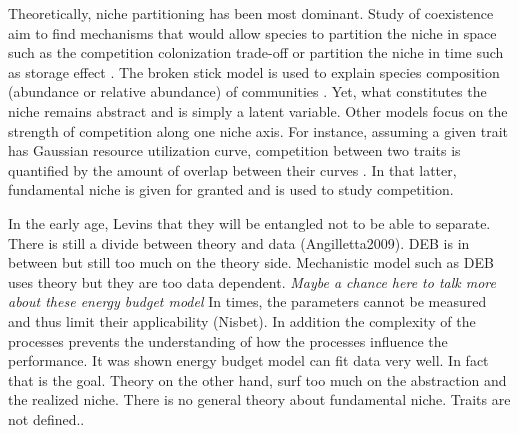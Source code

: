 Theoretically, niche partitioning has been most dominant.
Study of coexistence aim to find mechanisms that would allow species to partition the niche in space such as the competition colonization trade-off \citep[e.g.,][]{Levins1971,Tilman1994} or partition the niche in time such as storage effect \citep{Skellam1951, Chesson2000}. %
The broken stick model is used to explain species composition (abundance or relative abundance) of communities \citep{MacArthur1957}.
Yet, what constitutes the niche remains abstract and is simply a latent variable.
Other models focus on the strength of competition along one niche axis.
For instance, assuming a given trait has Gaussian resource utilization curve, competition  between two traits is quantified by the amount of overlap between their curves \citep{MacArthur1967, Roughgarden1979}.%
In that latter, fundamental niche is given for granted and is used to study competition.

In the early age, Levins that they will be entangled not to be able to separate.
There is still a divide between theory and data (Angilletta2009).
DEB is in between but still too much on the theory side.
Mechanistic model such as DEB uses theory but they are too data dependent.
\textit{Maybe a chance here to talk more about these energy budget model}
In times, the parameters cannot be measured and thus limit their applicability (Nisbet).
In addition the complexity of the processes prevents the understanding of how the processes influence the performance.
It was shown energy budget model can fit data very well.
In fact that is the goal.
Theory on the other hand, surf too much on the abstraction and the realized niche.
There is no general theory about fundamental niche.
Traits are not defined..

